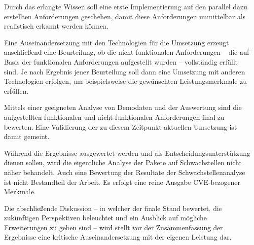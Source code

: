         Durch das erlangte Wissen soll eine erste Implementierung auf den parallel dazu erstellten Anforderungen geschehen, damit diese Anforderungen unmittelbar als realistisch erkannt werden können.
        
        Eine Auseinandersetzung mit den Technologien für die Umsetzung erzeugt anschließend eine Beurteilung, ob die nicht-funktionalen Anforderungen -- die auf Basis der funktionalen Anforderungen aufgestellt wurden -- vollständig erfüllt sind.
        Je nach Ergebnis jener Beurteilung soll dann eine Umsetzung mit anderen Technologien erfolgen, um beispielsweise die gewünschten Leistungsmerkmale zu erfüllen.
        
        Mittels einer geeigneten Analyse von Demodaten und der Auswertung sind die aufgestellten funktionalen und nicht-funktionalen Anforderungen final zu bewerten.
        Eine Validierung der zu diesem Zeitpunkt aktuellen Umsetzung ist damit gemeint.

        Während die Ergebnisse ausgewertet werden und als Entscheidungsunterstützung dienen sollen, wird die eigentliche Analyse der Pakete auf Schwachstellen nicht näher behandelt.
        Auch eine Bewertung der Resultate der Schwachstellenanalyse ist nicht Bestandteil der Arbeit.
        Es erfolgt eine reine Ausgabe \ac{CVE}-bezogener Merkmale.

        Die abschließende Diskussion -- in welcher der finale Stand bewertet, die zukünftigen Perspektiven beleuchtet und ein Ausblick auf mögliche Erweiterungen zu geben sind -- wird stellt vor der Zusammenfassung der Ergebnisse eine kritische Auseinandersetzung mit der eigenen Leistung dar.
